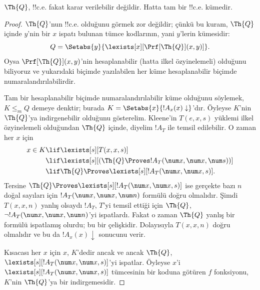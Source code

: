 \documentclass[../../../include/open-logic-section]{subfiles}
\begin{document}



\begin{thm}
$\Th{Q}$, !!{c.e.} fakat karar verilebilir değildir. Hatta tam bir
  !!{c.e.} kümedir.
\end{thm}

\begin{proof}
$\Th{Q}$'nun !!{c.e.} olduğunu görmek zor değildir; çünkü bu kuram,
$\Th{Q}$ içinde $y$'nin bir $x$ ispatı bulunan tümce kodlarının, yani
$y$'lerin kümesidir:
\[
Q = \Setabs{y}{\lexists[x][\Prf[\Th{Q}](x,y)]}.
\]
Oysa $\Prf[\Th{Q}](x,y)$'nin hesaplanabilir (hatta ilkel özyinelemeli)
olduğunu biliyoruz ve yukarıdaki biçimde yazılabilen her küme hesaplanabilir
biçimde numaralandırılabilirdir.

Tam bir hesaplanabilir biçimde numaralandırılabilir küme olduğunu söylemek,
$K \leq_m Q$ demeye denktir; burada
$K = \Setabs{x}{!A_x(x) \downarrow}$'dır. Öyleyse $K$'nin $\Th{Q}$'ya
indirgenebilir olduğunu gösterelim. Kleene'in $T(e,x,s)$ yüklemi ilkel
özyinelemeli olduğundan $\Th{Q}$ içinde, diyelim $!A_T$ ile temsil
edilebilir. O zaman her $x$ için
\begin{align*}
x \in K & \lif \lexists[s][T(x,x,s)] \\
& \lif \lexists[s][(\Th{Q} \Proves !A_T(\num x,\num x, \num s))]
  \\
& \lif \Th{Q} \Proves \lexists[s][!A_T(\num x, \num x, s)].
\end{align*}
Tersine $\Th{Q} \Proves \lexists[s][!A_T(\num x, \num x, s)]$ ise gerçekte
bazı $n$ doğal sayıları için $!A_T(\num x, \num x, \num n)$ formülü doğru
olmalıdır. Şimdi $T(x,x,n)$ yanlış olsaydı $!A_T$, $T$'yi temsil ettiği için
$\Th{Q}$, $\lnot !A_T(\num x, \num x, \num n)$'yi ispatlardı. Fakat o zaman
$\Th{Q}$ yanlış bir formülü ispatlamış olurdu; bu bir çelişkidir. Dolayısıyla
$T(x,x,n)$ doğru olmalıdır ve bu da $!A_x(x) \downarrow$ sonucunu verir.

Kısacası her $x$ için $x$, $K$'dedir ancak ve ancak $\Th{Q}$,
$\lexists[s][!A_T(\num x,\num x,s)]$'yi ispatlar. Öyleyse $x$'i
$\lexists[s][!A_T(\num x, \num x, s)]$ tümcesinin bir koduna götüren $f$
fonksiyonu, $K$'nin $\Th{Q}$'ya bir indirgemesidir.
\end{proof}
\end{document}

